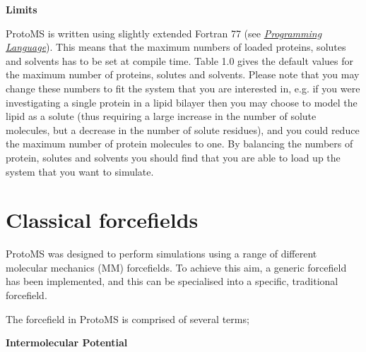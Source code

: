 \documentclass[letterpaper,10pt,english]{sphinxmanual}
\begin{document}
\textbf{Limits}

ProtoMS is written using slightly extended Fortran 77 (see {\hyperref[compilation:fortran77]{\emph{Programming Language}}}). This means that the maximum numbers of loaded proteins, solutes and solvents has to be set at compile time. Table 1.0 gives the default values for the maximum number of proteins, solutes and solvents. Please note that you may change these numbers to fit the system that you are interested in, e.g. if you were investigating a single protein in a lipid bilayer then you may choose to model the lipid as a solute (thus requiring a large increase in the number of solute molecules, but a decrease in the number of solute residues), and you could reduce the maximum number of protein molecules to one. By balancing the numbers of protein, solutes and solvents you should find that you are able to load up the system that you want to simulate.


\section{Classical forcefields}
\label{protoms:index-5}\label{protoms:classical-forcefields}
ProtoMS was designed to perform simulations using a range of different molecular mechanics (MM) forcefields. To achieve this aim, a generic forcefield has been implemented, and this can be specialised into a specific, traditional forcefield.

The forcefield in ProtoMS is comprised of several terms;

\textbf{Intermolecular Potential}
\end{document}
